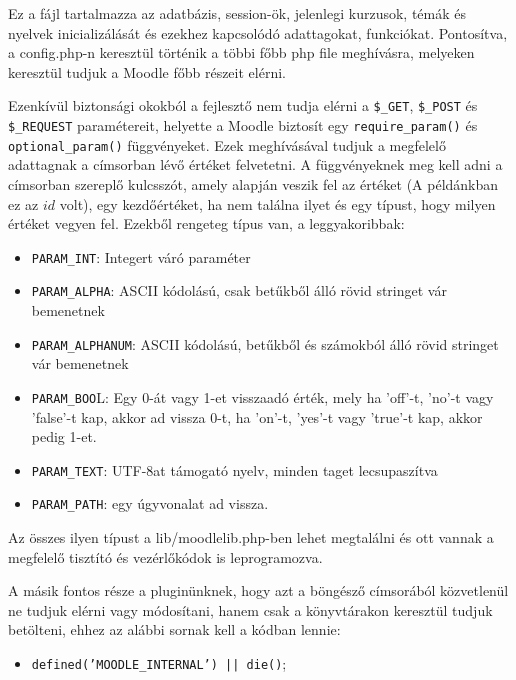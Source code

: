 Ez a fájl tartalmazza az adatbázis, session-ök, jelenlegi kurzusok, témák és nyelvek inicializálását és ezekhez kapcsolódó adattagokat, funkciókat. Pontosítva, a config.php-n keresztül történik a többi főbb php file meghívásra, melyeken keresztül tudjuk a Moodle főbb részeit elérni. \par

Ezenkívül biztonsági okokból a fejlesztő nem tudja elérni a \texttt{\$\_GET},  \texttt{\$\_POST} és  \texttt{\$\_REQUEST} paramétereit, helyette a Moodle biztosít egy \texttt{require\_param()} és \texttt{optional\_param()} függvényeket. Ezek meghívásával tudjuk a megfelelő adattagnak a címsorban lévő értéket felvetetni. A függvényeknek meg kell adni a címsorban szereplő kulcsszót, amely alapján veszik fel az értéket (A példánkban ez az $id$ volt), egy kezdőértéket, ha nem találna ilyet és egy típust, hogy milyen értéket vegyen fel. Ezekből rengeteg típus van, a leggyakoribbak:

\begin{itemize}
    \item \texttt{PARAM\_INT}: Integert váró paraméter
    \item \texttt{PARAM\_ALPHA}: ASCII kódolású, csak betűkből álló rövid stringet vár bemenetnek
    \item \texttt{PARAM\_ALPHANUM}: ASCII kódolású, betűkből és számokból álló rövid stringet vár bemenetnek
    \item \texttt{PARAM\_BOO}L: Egy 0-át vagy 1-et visszaadó érték, mely ha 'off'-t, 'no'-t vagy 'false'-t kap, akkor ad vissza 0-t, ha 'on'-t, 'yes'-t vagy 'true'-t kap, akkor pedig 1-et.
    \item \texttt{PARAM\_TEXT}: UTF-8at támogató nyelv, minden taget lecsupaszítva
    \item \texttt{PARAM\_PATH}: egy úgyvonalat ad vissza.
\end{itemize}

Az összes ilyen típust a lib/moodlelib.php-ben lehet megtalálni és ott vannak a megfelelő tisztító és vezérlőkódok is leprogramozva.

A másik fontos része a pluginünknek, hogy azt a böngésző címsorából közvetlenül ne tudjuk elérni vagy módosítani, hanem csak a könyvtárakon keresztül tudjuk betölteni, ehhez az alábbi sornak kell a kódban lennie: \par
\begin{itemize}
    \item[] \texttt{defined('MOODLE\_INTERNAL') || die()};
\end{itemize}


